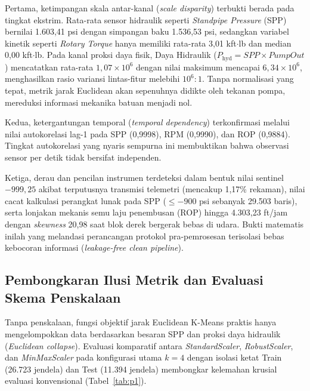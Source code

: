 \documentclass[conference]{IEEEtran}
\begin{document}
Pertama, ketimpangan skala antar-kanal (\textit{scale disparity}) terbukti berada pada tingkat ekstrim. Rata-rata sensor hidraulik seperti \textit{Standpipe Pressure} (SPP) bernilai 1.603,41 psi dengan simpangan baku 1.536,53 psi, sedangkan variabel kinetik seperti \textit{Rotary Torque} hanya memiliki rata-rata 3,01 kft$\cdot$lb dan median 0,00 kft$\cdot$lb. Pada kanal proksi daya fisik, Daya Hidraulik ($P_{\text{hyd}} = SPP \times PumpOut$) mencatatkan rata-rata $1{,}07 \times 10^6$ dengan nilai maksimum mencapai $6{,}34 \times 10^6$, menghasilkan rasio variansi lintas-fitur melebihi $10^6 : 1$. Tanpa normalisasi yang tepat, metrik jarak Euclidean akan sepenuhnya didikte oleh tekanan pompa, mereduksi informasi mekanika batuan menjadi nol.

Kedua, ketergantungan temporal (\textit{temporal dependency}) terkonfirmasi melalui nilai autokorelasi lag-1 pada SPP (0,9998), RPM (0,9990), dan ROP (0,9884). Tingkat autokorelasi yang nyaris sempurna ini membuktikan bahwa observasi sensor per detik tidak bersifat independen.

Ketiga, derau dan pencilan instrumen terdeteksi dalam bentuk nilai sentinel $-999{,}25$ akibat terputusnya transmisi telemetri (mencakup 1,17\% rekaman), nilai cacat kalkulasi perangkat lunak pada SPP ($\le -900$ psi sebanyak 29.503 baris), serta lonjakan mekanis semu laju penembusan (ROP) hingga 4.303,23 ft/jam dengan \textit{skewness} 20,98 saat blok derek bergerak bebas di udara. Bukti matematis inilah yang melandasi perancangan protokol pra-pemrosesan terisolasi bebas kebocoran informasi (\textit{leakage-free clean pipeline}).

\subsection{Pembongkaran Ilusi Metrik dan Evaluasi Skema Penskalaan}
Tanpa penskalaan, fungsi objektif jarak Euclidean K-Means praktis hanya mengelompokkan data berdasarkan besaran SPP dan proksi daya hidraulik (\textit{Euclidean collapse}). Evaluasi komparatif antara \textit{StandardScaler}, \textit{RobustScaler}, dan \textit{MinMaxScaler} pada konfigurasi utama $k = 4$ dengan isolasi ketat Train (26.723 jendela) dan Test (11.394 jendela) membongkar kelemahan krusial evaluasi konvensional (Tabel~\ref{tab:p1}).
\end{document}
